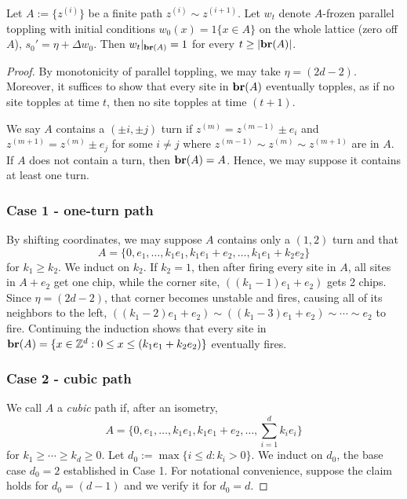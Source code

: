 \documentclass[12pt]{amsart}
\begin{document}
\begin{lemma}\label{lemma:local_convexity}
	Let $A := \{z^{(i)}\}$ be a finite path $z^{(i)} \sim z^{(i+1)}$.
	Let $w_t$ denote $A$-frozen parallel toppling with initial conditions 
	$w_0(x) = 1\{x \in A\}$ on the whole lattice (zero off $A$), $s_0' = \eta + \Delta w_0$. Then $w_t|_{\mathbf{br}(A)} = 1$ for every $t \geq |\mathbf{br}(A)|$.   
\end{lemma}
\begin{proof}
	By monotonicity of parallel toppling, we may take $\eta = (2 d - 2)$. Moreover, 
	it suffices to show that every site in $\mathbf{br}(A)$ eventually topples, as if no site topples at time $t$, then no site topples at time $(t+1)$.
	
	We say $A$ contains a $( \pm i, \pm j)$ turn if $z^{(m)} = z^{(m-1)} \pm  e_i$ and $z^{(m+1)} = z^{(m)} \pm e_j$
	for some $i \not = j$ where $z^{(m-1)} \sim z^{(m)} \sim z^{(m+1)}$ are in $A$.
	If $A$ does not contain a turn, then $\mathbf{br}(A) = A$. Hence, we may suppose it contains at least one turn.
	
	\subsubsection*{Case 1 - one-turn path}
	By shifting coordinates, we may suppose $A$ contains only a $(1,2)$ turn and that 
	\begin{equation}
	A = \{ 0, e_1, \ldots, k_1 e_1, k_1 e_1 + e_2, \ldots, k_1 e_1 + k_2 e_2 \}
	\end{equation}
	for $k_1 \geq k_2$.	We induct on $k_2$. If $k_2 = 1$, then after firing every site in $A$, 
	all sites in $A + e_2$ get one chip, while the corner site,
	$((k_1 - 1) e_1 + e_2)$ gets 2 chips. Since $\eta = (2 d- 2)$, that corner becomes unstable and fires, 
	causing all of its neighbors to the left, $((k_1 - 2) e_1 + e_2) \sim ((k_1 - 3) e_1 + e_2) \sim \cdots \sim e_2$ to fire. Continuing the induction shows that every site in $\mathbf{br}(A) = \{ x \in \mathbb{Z}^d : 0 \leq x \leq (k_1 e_1 + k_2 e_2)\}$ eventually fires. 
	
	\subsubsection*{Case 2 - cubic path} 
	We call $A$ a {\it cubic} path if, after an isometry, 
	\begin{equation}
	A = \{ 0, e_1, \ldots, k_1 e_1, k_1 e_1 + e_2, \ldots, \sum_{i=1}^d k_i e_i \}
	\end{equation}
	for $k_1 \geq \cdots \geq k_d \geq 0$. Let $d_0 := \max \{ i \leq d : k_i > 0 \}$. We induct on $d_0$, the base case $d_0 = 2$ established in Case 1. 
	For notational convenience, suppose the claim holds for $d_0 = (d-1)$ and we verify it for $d_0 = d$.
	

\end{proof}
\end{document}
